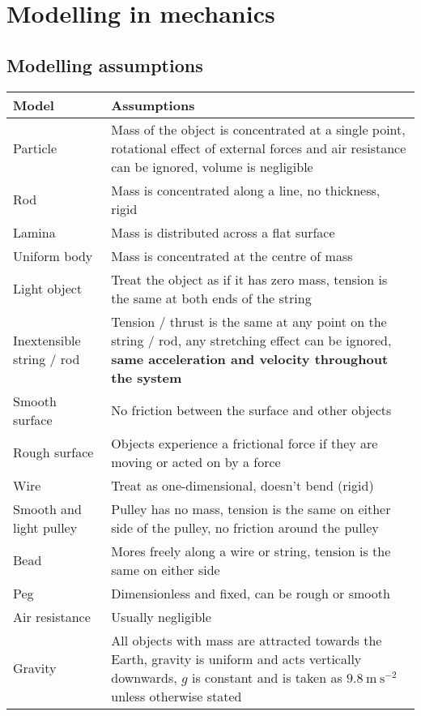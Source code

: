 \chapter{Modelling in mechanics}
\section{Modelling assumptions}
\begin{tabular}{|m{3.9cm} | m{13.5cm}|}
	\hline
	\textbf{Model} & \textbf{Assumptions} \\
	\hline
	Particle & Mass of the object is concentrated at a single point, rotational effect of external forces and air resistance can be ignored, volume is negligible \\
	\hline
	Rod & Mass is concentrated along a line, no thickness, rigid \\
	\hline
	Lamina & Mass is distributed across a flat surface \\
	\hline
	Uniform body & Mass is concentrated at the centre of mass \\
	\hline
	Light object & Treat the object as if it has zero mass, tension is the same at both ends of the string  \\
	\hline
	Inextensible string / rod & Tension / thrust is the same at any point on the string / rod, any stretching effect can be ignored, \textbf{same acceleration and velocity throughout the system} \\
	\hline
	Smooth surface & No friction between the surface and other objects\\
	\hline
	Rough surface &  Objects experience a frictional force if they are moving or acted on by a force  \\
	\hline
	Wire &  Treat as one-dimensional, doesn't bend (rigid) \\
	\hline
	Smooth and light pulley & Pulley has no mass, tension is the same on either side of the pulley, no friction around the pulley \\
	\hline
	Bead & Mores freely along a wire or string, tension is the same on either side  \\
	\hline
	Peg & Dimensionless and fixed, can be rough or smooth \\
	\hline
	Air resistance & Usually negligible  \\
	\hline
	Gravity &  All objects with mass are attracted towards the Earth, gravity is uniform and acts vertically downwards, $g$ is constant and is taken as $9.8 \: \mathrm{m} \: \mathrm{s}^{-2}$ unless otherwise stated \\
	\hline
\end{tabular}

